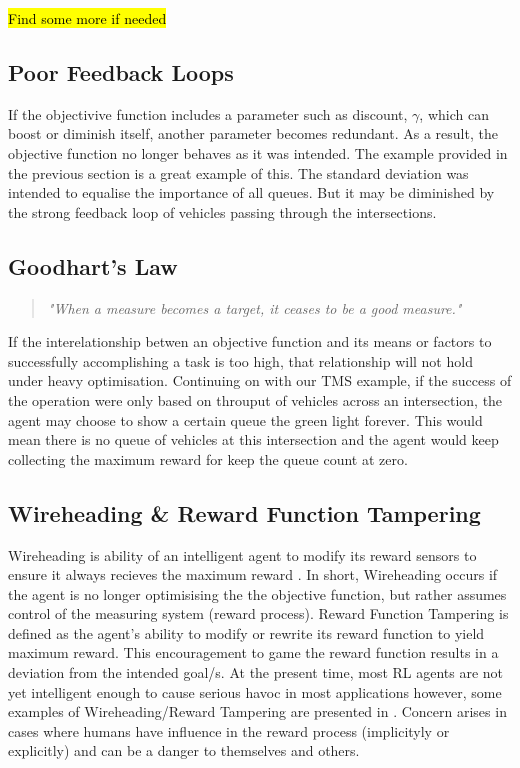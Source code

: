 \documentclass[a4paper,12pt]{report}
\begin{document}
\hl{Find some more if needed}

\subsection{Poor Feedback Loops}
If the objectivive function includes a parameter such as discount, $\gamma$, which can boost or diminish itself, another parameter becomes redundant.
As a result, the objective function no longer behaves as it was intended.
The example provided in the previous section is a great example of this. The standard deviation was intended to equalise the importance of all queues.
But it may be diminished by the strong feedback loop of vehicles passing through the intersections.

\subsection{Goodhart's Law}
\begin{quotation}
    \textit{"When a measure becomes a target, it ceases to be a good measure."}
\end{quotation}
If the interelationship betwen an objective function and its means or factors to successfully accomplishing a task is too high,
that relationship will not hold under heavy optimisation. 
Continuing on with our TMS example, if the success of the operation were only based on throuput of vehicles across an intersection,
the agent may choose to show a certain queue the green light forever. 
This would mean there is no queue of vehicles at this intersection and the agent would keep collecting the maximum reward for keep the queue count at zero.

\subsection{Wireheading \& Reward Function Tampering}
Wireheading is ability of an intelligent agent to modify its reward sensors to ensure it always recieves the maximum reward \cite{JOO2020324}. 
In short, Wireheading occurs if the agent is no longer optimisising the the objective function, but rather assumes control of the measuring system (reward process).
Reward Function Tampering is defined as the agent's ability to modify or rewrite its reward function to yield maximum reward.
This encouragement to game the reward function results in a deviation from the intended goal/s. 
At the present time, most RL agents are not yet intelligent enough to cause serious havoc in most applications however, some examples of Wireheading/Reward Tampering are presented in \cite{DBLP:journals/corr/abs-1908-04734}.  
Concern arises in cases where humans have influence in the reward process (implicityly or explicitly) and can be a danger to themselves and others.
\end{document}
